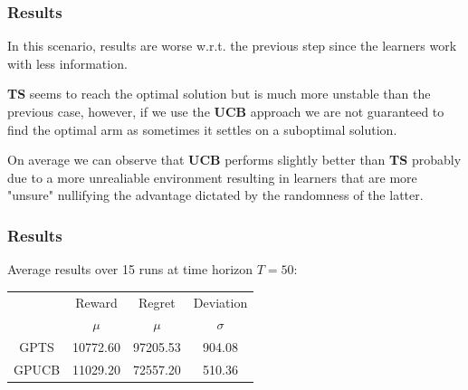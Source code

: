 
\begin{frame}

\frametitle{Results}

In this scenario, results are worse w.r.t. the previous step since the learners work with less information.

\textbf{TS} seems to reach the optimal solution but is much more unstable than the previous case, however, if we use the \textbf{UCB} approach we are not guaranteed to find the optimal arm as sometimes it settles on a suboptimal solution.

On average we can observe that \textbf{UCB} performs slightly better than \textbf{TS} probably due to a more unrealiable environment resulting in learners that are more "unsure" nullifying the advantage dictated by the randomness of the latter.

\end{frame}


\begin{frame}

\frametitle{Results}

Average results over 15 runs at time horizon $T = 50$:

\begin{table}
	\begin{tabular}{|c|cc|c|}
	\hline \hline
		\cellcolor{blue!25} & Reward 	& Regret	& Deviation \\
	\cline{2-4}
		\cellcolor{blue!25} & $\mu$		& $\mu$		& $\sigma$	\\
	\hline \hline
		GPTS 				& 10772.60	& 97205.53	& 904.08	\\
	\hline
		GPUCB				& 11029.20	& 72557.20	& 510.36	\\
	\hline \hline
	\end{tabular}
\end{table}

\end{frame}

